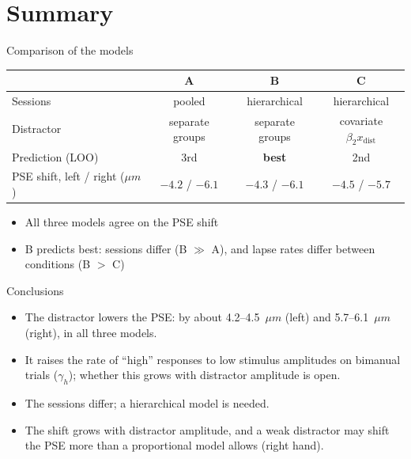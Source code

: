 \section{Summary}

\begin{frame}{Comparison of the models}
  \centering
  \begin{tabular}{lccc}
    \toprule
     & A & B & C \\
    \midrule
    Sessions & pooled & hierarchical & hierarchical \\
    Distractor & separate groups & separate groups & covariate $\beta_2 x_\text{dist}$ \\
    Prediction (LOO) & 3rd & \textbf{best} & 2nd \\
    PSE shift, left / right ($\mu m$) & $-4.2$ / $-6.1$ & $-4.3$ / $-6.1$ & $-4.5$ / $-5.7$ \\
    \bottomrule
  \end{tabular}

  \vfill
  \raggedright
  \begin{itemize}
    \item All three models agree on the PSE shift
    \item B predicts best: sessions differ (B $\gg$ A), and lapse rates differ between
          conditions (B $>$ C)
  \end{itemize}
\end{frame}

\begin{frame}{Conclusions}
  \begin{itemize}
    \item The distractor lowers the PSE: by about 4.2--4.5~$\mu m$ (left) and 5.7--6.1~$\mu m$
          (right), in all three models.
    \item It raises the rate of ``high'' responses to low stimulus amplitudes on bimanual trials
          ($\gamma_h$); whether this grows with distractor amplitude is open.
    \item The sessions differ; a hierarchical model is needed.
    \item The shift grows with distractor amplitude, and a weak distractor may shift the PSE
          more than a proportional model allows (right hand).
  \end{itemize}
\end{frame}

